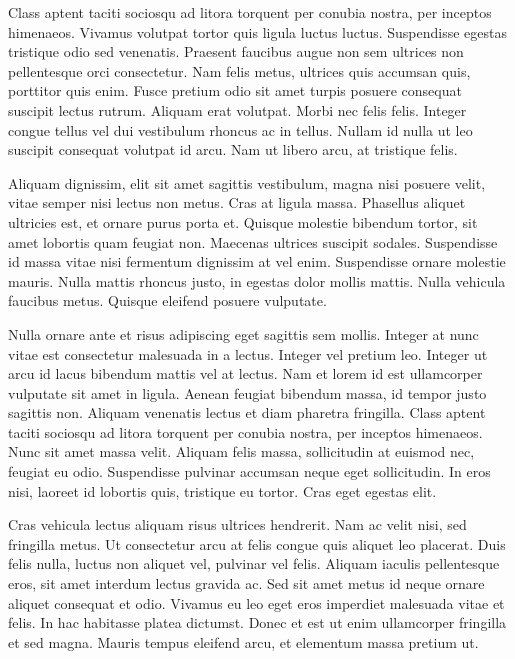 Class aptent taciti sociosqu ad litora torquent per conubia nostra, per inceptos himenaeos.
Vivamus volutpat tortor quis ligula luctus luctus.
Suspendisse egestas tristique odio sed venenatis.
Praesent faucibus augue non sem ultrices non pellentesque orci consectetur.
Nam felis metus, ultrices quis accumsan quis, porttitor quis enim.
Fusce pretium odio sit amet turpis posuere consequat suscipit lectus rutrum.
Aliquam erat volutpat.
Morbi nec felis felis.
Integer congue tellus vel dui vestibulum rhoncus ac in tellus.
Nullam id nulla ut leo suscipit consequat volutpat id arcu.
Nam ut libero arcu, at tristique felis.

Aliquam dignissim, elit sit amet sagittis vestibulum, magna nisi posuere velit, vitae semper nisi lectus non metus.
Cras at ligula massa.
Phasellus aliquet ultricies est, et ornare purus porta et.
Quisque molestie bibendum tortor, sit amet lobortis quam feugiat non.
Maecenas ultrices suscipit sodales.
Suspendisse id massa vitae nisi fermentum dignissim at vel enim.
Suspendisse ornare molestie mauris.
Nulla mattis rhoncus justo, in egestas dolor mollis mattis.
Nulla vehicula faucibus metus.
Quisque eleifend posuere vulputate.

Nulla ornare ante et risus adipiscing eget sagittis sem mollis.
Integer at nunc vitae est consectetur malesuada in a lectus.
Integer vel pretium leo.
Integer ut arcu id lacus bibendum mattis vel at lectus.
Nam et lorem id est ullamcorper vulputate sit amet in ligula.
Aenean feugiat bibendum massa, id tempor justo sagittis non.
Aliquam venenatis lectus et diam pharetra fringilla.
Class aptent taciti sociosqu ad litora torquent per conubia nostra, per inceptos himenaeos.
Nunc sit amet massa velit.
Aliquam felis massa, sollicitudin at euismod nec, feugiat eu odio.
Suspendisse pulvinar accumsan neque eget sollicitudin.
In eros nisi, laoreet id lobortis quis, tristique eu tortor.
Cras eget egestas elit.

Cras vehicula lectus aliquam risus ultrices hendrerit.
Nam ac velit nisi, sed fringilla metus.
Ut consectetur arcu at felis congue quis aliquet leo placerat.
Duis felis nulla, luctus non aliquet vel, pulvinar vel felis.
Aliquam iaculis pellentesque eros, sit amet interdum lectus gravida ac.
Sed sit amet metus id neque ornare aliquet consequat et odio.
Vivamus eu leo eget eros imperdiet malesuada vitae et felis.
In hac habitasse platea dictumst.
Donec et est ut enim ullamcorper fringilla et sed magna.
Mauris tempus eleifend arcu, et elementum massa pretium ut.


